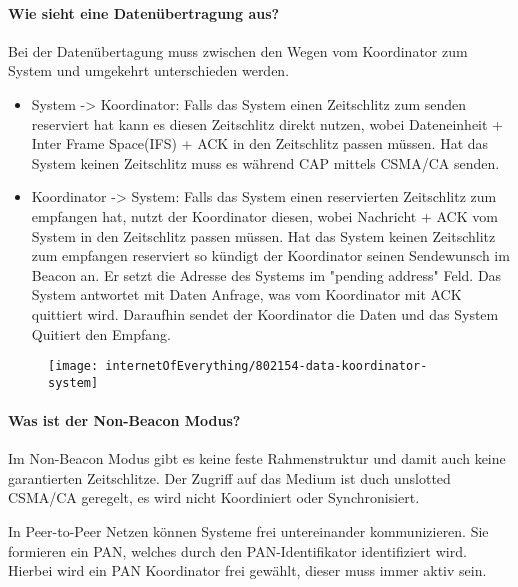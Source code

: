 	\paragraph{Wie sieht eine Datenübertragung aus?}
	Bei der Datenübertagung muss zwischen den Wegen vom Koordinator zum System und umgekehrt unterschieden werden.
	\begin{itemize}
		\item System -> Koordinator: Falls das System einen Zeitschlitz zum senden reserviert hat kann es diesen Zeitschlitz direkt nutzen, wobei Dateneinheit + Inter Frame Space(IFS) + ACK  in den Zeitschlitz passen müssen. Hat das System keinen Zeitschlitz muss es während CAP mittels CSMA/CA senden.
		
		\item Koordinator -> System: Falls das System einen reservierten Zeitschlitz zum empfangen hat, nutzt der Koordinator diesen, wobei Nachricht + ACK vom System in den Zeitschlitz passen müssen. Hat das System keinen Zeitschlitz zum empfangen reserviert so kündigt der Koordinator seinen Sendewunsch im Beacon an. Er setzt die Adresse des Systems im "pending address" Feld. Das System antwortet mit Daten Anfrage, was vom Koordinator mit ACK quittiert wird. Daraufhin sendet der Koordinator die Daten und das System Quitiert den Empfang.
	\end{itemize}
	\begin{figure}[H]
		\centering
		\texttt{[image: internetOfEverything/802154-data-koordinator-system]}	
	\end{figure}
	
	\paragraph{Was ist der Non-Beacon Modus?}
	Im Non-Beacon Modus gibt es keine feste Rahmenstruktur und damit auch keine garantierten Zeitschlitze. Der Zugriff auf das Medium ist duch unslotted CSMA/CA geregelt, es wird nicht Koordiniert oder Synchronisiert.
	 
	 In Peer-to-Peer Netzen können Systeme frei untereinander kommunizieren. Sie formieren ein PAN, welches durch den PAN-Identifikator identifiziert wird. Hierbei wird ein PAN Koordinator frei gewählt, dieser muss immer aktiv sein.
